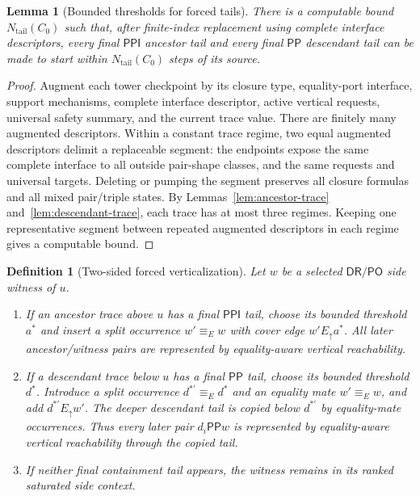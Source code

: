 \documentclass[11pt]{article}
\newtheorem{lemma}[theorem]{Lemma}
\newtheorem{definition}[theorem]{Definition}
\newcommand{\DR}{\mathsf{DR}}
\newcommand{\PO}{\mathsf{PO}}
\newcommand{\PP}{\mathsf{PP}}
\newcommand{\PPI}{\mathsf{PPI}}
\newcommand{\Eq}{\equiv_{\!E}}
\begin{document}
\begin{lemma}[Bounded thresholds for forced tails]
\label{lem:thresholds}
There is a computable bound $N_{\mathrm{tail}}(C_0)$ such that, after finite-index replacement using complete interface descriptors, every final $\PPI$ ancestor tail and every final $\PP$ descendant tail can be made to start within $N_{\mathrm{tail}}(C_0)$ steps of its source.
\end{lemma}

\begin{proof}
Augment each tower checkpoint by its closure type, equality-port interface, support mechanisms, complete interface descriptor, active vertical requests, universal safety summary, and the current trace value.  There are finitely many augmented descriptors.  Within a constant trace regime, two equal augmented descriptors delimit a replaceable segment: the endpoints expose the same complete interface to all outside pair-shape classes, and the same requests and universal targets.  Deleting or pumping the segment preserves all closure formulas and all mixed pair/triple states.  By Lemmas~\ref{lem:ancestor-trace} and~\ref{lem:descendant-trace}, each trace has at most three regimes.  Keeping one representative segment between repeated augmented descriptors in each regime gives a computable bound.
\end{proof}

\begin{definition}[Two-sided forced verticalization]
\label{def:two-sided-verticalization}
Let $w$ be a selected $\DR/\PO$ side witness of $u$.
\begin{enumerate}[label=(V\arabic*)]
\item If an ancestor trace above $u$ has a final $\PPI$ tail, choose its bounded threshold $a^*$ and insert a split occurrence $w'\Eq w$ with cover edge $w' E_\uparrow a^*$.  All later ancestor/witness pairs are represented by equality-aware vertical reachability.
\item If a descendant trace below $u$ has a final $\PP$ tail, choose its bounded threshold $d^*$.  Introduce a split occurrence $d^{*'}\Eq d^*$ and an equality mate $w'\Eq w$, and add $d^{*'}E_\uparrow w'$.  The deeper descendant tail is copied below $d^{*'}$ by equality-mate occurrences.  Thus every later pair $d_i\PP w$ is represented by equality-aware vertical reachability through the copied tail.
\item If neither final containment tail appears, the witness remains in its ranked saturated side context.
\end{enumerate}
\end{definition}
\end{document}
